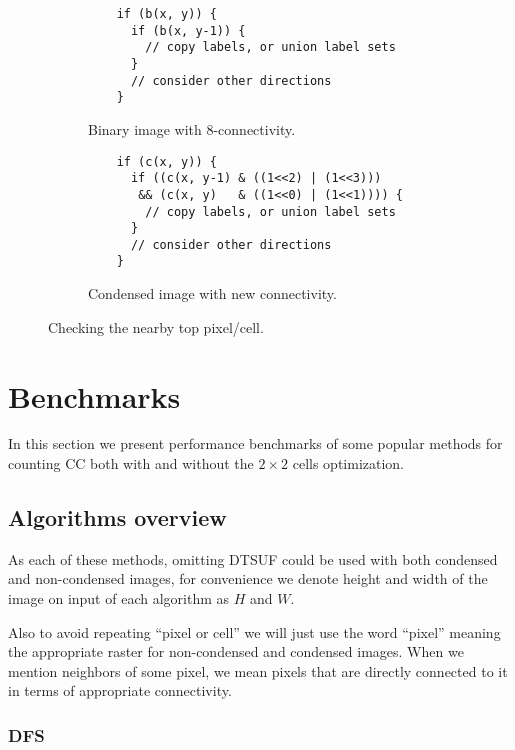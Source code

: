 \documentclass{llncs}
\begin{document}
\begin{figure}
  \centering
  \begin{subfigure}[t]{0.475\linewidth}
    \centering
    \begin{lstlisting}
    if (b(x, y)) {
      if (b(x, y-1)) {
        // copy labels, or union label sets
      }
      // consider other directions
    }
    \end{lstlisting}
    \caption{Binary image with 8-connectivity.}
  \end{subfigure}
  \quad
  \begin{subfigure}[t]{0.475\linewidth}
    \centering
    \begin{lstlisting}
    if (c(x, y)) {
      if ((c(x, y-1) & ((1<<2) | (1<<3)))
       && (c(x, y)   & ((1<<0) | (1<<1)))) {
        // copy labels, or union label sets
      }
      // consider other directions
    }
    \end{lstlisting}
    \caption{Condensed image with new connectivity.}
  \end{subfigure}
  \caption{Checking the nearby top pixel/cell.}
  \label{fig:connectivity:code}
\end{figure}

\section{Benchmarks}

In this section we present performance benchmarks of some popular methods for
counting CC both with and without the $2 \times 2$ cells optimization.

\subsection{Algorithms overview}

As each of these methods, omitting DTSUF could be used with both condensed and
non-condensed images, for convenience we denote height and width of the image
on input of each algorithm as $H$ and $W$.

Also to avoid repeating ``pixel or cell'' we will just use the word ``pixel''
meaning the appropriate raster for non-condensed and condensed images.
When we mention neighbors of some pixel, we mean pixels that are directly connected
to it in terms of appropriate connectivity.

\subsubsection{DFS}
\end{document}
